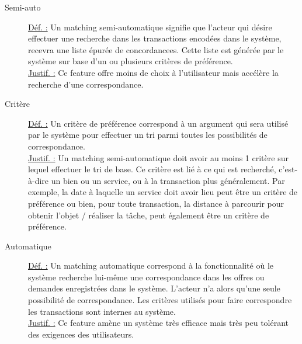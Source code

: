 \begin{description}
\item [Semi-auto]
\underline{Déf. :}  Un matching semi-automatique signifie que l'acteur qui désire effectuer une recherche dans les transactions encodées dans le système,  recevra une liste épurée de concordancees.  Cette liste est générée par le système sur base d'un ou plusieurs critères de préférence.
\\ \underline{Justif. :}  Ce feature offre moins de choix à l'utilisateur mais accélère la recherche d'une correspondance.
\newline

\item [Critère]
\underline{Déf. :}  Un critère de préférence correspond à un argument qui sera utilisé par le système pour effectuer un tri parmi toutes les possibilités de correspondance.
\\ \underline{Justif. :}  Un matching semi-automatique doit avoir au moins 1 critère sur lequel effectuer le tri de base.  Ce critère est lié à ce qui est recherché,  c'est-à-dire un bien ou un service,  ou à la transaction plus généralement.  Par exemple,  la date à laquelle un service doit avoir lieu peut être un critère de préférence ou bien,  pour toute transaction,  la distance à parcourir pour obtenir l'objet / réaliser la tâche,  peut également être un critère de préférence.   
\newline

\item [Automatique]
\underline{Déf. :}  Un matching automatique correspond à la fonctionnalité où le système recherche lui-même une correspondance dans les offres ou demandes enregistrées dans le système.  L'acteur n'a alors qu'une seule possibilité de correspondance.  Les critères utilisés pour faire correspondre les transactions sont internes au système.
\\ \underline{Justif. :}  Ce feature amène un système très efficace mais très peu tolérant des exigences des utilisateurs.  
\newline


\end{description}
